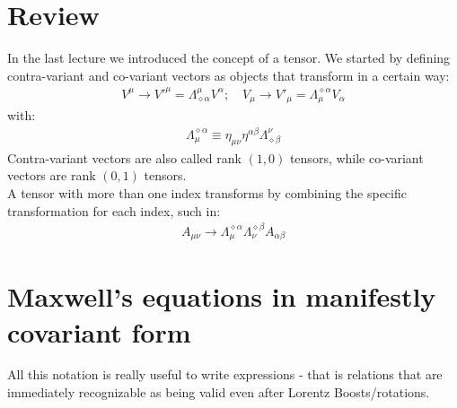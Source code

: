 \documentclass[../template.tex]{subfiles}
\begin{document}
\section{Review}
In the last lecture we introduced the concept of a tensor. We started by defining contra-variant and co-variant vectors as objects that transform in a certain way:
\begin{align*}
    V^\mu \to V'^\mu = \Lambda^\mu_{\diamond \alpha}V^\alpha; \quad V_\mu \to V'_\mu = \Lambda_\mu^{\diamond \alpha}V_\alpha
\end{align*}
with:
\begin{align*}
    \Lambda_\mu^{\diamond \alpha} \equiv \eta_{\mu \nu}\eta^{\alpha \beta} \Lambda^\nu_{\diamond \beta}
\end{align*}
Contra-variant vectors are also called rank $(1,0)$ tensors, while co-variant vectors are rank $(0,1)$ tensors.\\
A tensor with more than one index transforms by combining the specific transformation for each index, such in:
\begin{align*}
    A_{\mu \nu} \to \Lambda_\mu^{\diamond \alpha} \Lambda_\nu^{\diamond \beta} A_{\alpha \beta}
\end{align*} 

\section{Maxwell's equations in manifestly covariant form}
All this notation is really useful to write  expressions - that is relations that are immediately recognizable as being valid even after Lorentz Boosts/rotations.\\
\end{document}
